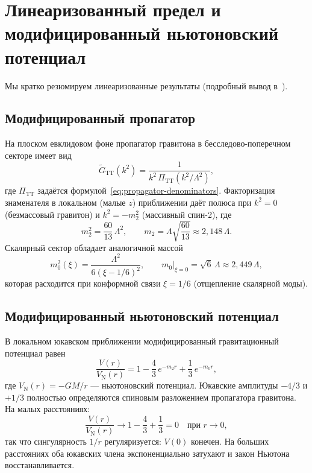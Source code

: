 \documentclass[12pt,a4paper]{article}
\newcommand{\PiTT}{\Pi_{\mathrm{TT}}}
\newcommand{\Lam}{\Lambda}
\theoremstyle{plain}
\theoremstyle{definition}
\begin{document}
\section{Линеаризованный предел и модифицированный ньютоновский потенциал}
\label{sec:linearized}

Мы кратко резюмируем линеаризованные результаты (подробный вывод
в~\cite{Alfyorov:2026ff,Alfyorov:2026ss}).

\subsection{Модифицированный пропагатор}

На плоском евклидовом фоне пропагатор гравитона в бесследово-поперечном
секторе имеет вид
\begin{equation}\label{eq:GF-TT}
  \tilde{G}_{\mathrm{TT}}(k^2)
  = \frac{1}{k^2\,\PiTT(k^2/\Lam^2)},
\end{equation}
где $\PiTT$ задаётся формулой~\eqref{eq:propagator-denominators}.
Факторизация знаменателя в локальном (малые $z$) приближении даёт полюса
при $k^2 = 0$ (безмассовый гравитон) и $k^2 = -m_2^2$ (массивный спин-2),
где
\begin{equation}\label{eq:m2}
  m_2^2 = \frac{60}{13}\,\Lam^2,
  \qquad m_2 = \Lam\sqrt{\frac{60}{13}} \approx 2{,}148\,\Lam.
\end{equation}
Скалярный сектор обладает аналогичной массой
\begin{equation}\label{eq:m0}
  m_0^2(\xi) = \frac{\Lam^2}{6(\xi - 1/6)^2},
  \qquad m_0\big|_{\xi=0} = \sqrt{6}\,\Lam \approx 2{,}449\,\Lam,
\end{equation}
которая расходится при конформной связи $\xi = 1/6$ (отщепление скалярной
моды).

\subsection{Модифицированный ньютоновский потенциал}

В локальном юкавском приближении модифицированный гравитационный потенциал
равен
\begin{equation}\label{eq:V-ratio}
  \frac{V(r)}{V_\mathrm{N}(r)}
  = 1 - \frac{4}{3}\,e^{-m_2 r} + \frac{1}{3}\,e^{-m_0 r},
\end{equation}
где $V_\mathrm{N}(r) = -GM/r$ --- ньютоновский потенциал.  Юкавские
амплитуды $-4/3$ и $+1/3$ полностью определяются спиновым разложением
пропагатора гравитона.  На малых расстояниях:
\begin{equation}\label{eq:V-short}
  \frac{V(r)}{V_\mathrm{N}(r)} \to 1 - \frac{4}{3} + \frac{1}{3} = 0
  \quad\text{при } r \to 0,
\end{equation}
так что сингулярность $1/r$ регуляризуется: $V(0)$ конечен.  На больших
расстояниях оба юкавских члена экспоненциально затухают и закон Ньютона
восстанавливается.
\end{document}
